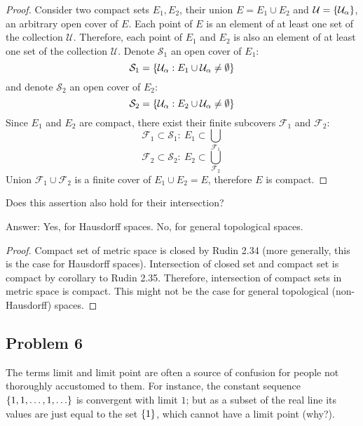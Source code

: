 \documentclass{article}
\DeclarePairedDelimiter{\set}{ \{ }{ \} }
\begin{document}
\begin{proof}

Consider two compact sets $E_1, E_2$, their union $E = E_1 \cup E_2$ and $\mathcal{U} = \set{ \mathcal{U}_\alpha }$, an arbitrary open cover of $E$.
Each point of $E$ is an element of at least one set of the collection $\mathcal{U}$.
Therefore, each point of $E_1$ and $E_2$ is also an element of at least one set of the collection $\mathcal{U}$.
Denote $\mathcal{S}_1$ an open cover of $E_1$:
\[ \mathcal{S}_1 = \set{ \mathcal{U}_\alpha : E_1 \cup \mathcal{U}_\alpha \neq \emptyset } \]
and denote $\mathcal{S}_2$ an open cover of $E_2$:
\[ \mathcal{S}_2 = \set{ \mathcal{U}_\alpha : E_2 \cup \mathcal{U}_\alpha \neq \emptyset } \]
Since $E_1$ and $E_2$ are compact, there exist their finite subcovers $\mathcal{F}_1$ and $\mathcal{F}_2$:
\[ \mathcal{F}_1 \subset \mathcal{S}_1 : \> E_1 \subset \bigcup_{\mathcal{F}_1} \]
\[ \mathcal{F}_2 \subset \mathcal{S}_2 : \> E_2 \subset \bigcup_{\mathcal{F}_2} \]
Union $\mathcal{F}_1 \cup \mathcal{F}_2$ is a finite cover of $E_1 \cup E_2 = E$, therefore $E$ is compact.

\end{proof}

\begin{tcolorbox}
Does this assertion also hold for their intersection?
\end{tcolorbox}
Answer: Yes, for Hausdorff spaces. No, for general topological spaces.

\begin{proof}

Compact set of metric space is closed by Rudin 2.34 (more generally, this is the case for Hausdorff spaces).
Intersection of closed set and compact set is compact by corollary to Rudin 2.35.
Therefore, intersection of compact sets in metric space is compact.
This might not be the case for general topological (non-Hausdorff) spaces.

\end{proof}


\subsection*{Problem 6}

\begin{tcolorbox}
The terms limit and limit point are often a source of confusion for people not thoroughly accustomed to them.
For instance, the constant sequence $\set{ 1, 1, \dots , 1, \dots }$ is convergent with limit $1$; but as a subset of the real line its values are just equal to the set $\set{1}$, which cannot have a limit point (why?).
\end{tcolorbox}
\end{document}
